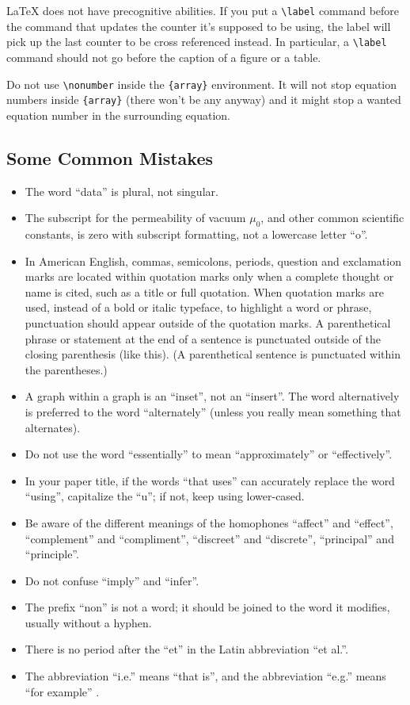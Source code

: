 \documentclass[conference]{IEEEtran}
\begin{document}
{\LaTeX} does not have precognitive abilities. If you put a
\verb|\label| command before the command that updates the counter it's
supposed to be using, the label will pick up the last counter to be
cross referenced instead. In particular, a \verb|\label| command
should not go before the caption of a figure or a table.

Do not use \verb|\nonumber| inside the \verb|{array}| environment. It
will not stop equation numbers inside \verb|{array}| (there won't be
any anyway) and it might stop a wanted equation number in the
surrounding equation.

\subsection{Some Common Mistakes}\label{SCM}
\begin{itemize}
\item The word ``data'' is plural, not singular.
\item The subscript for the permeability of vacuum $\mu_{0}$, and other common scientific constants, is zero with subscript formatting, not a lowercase letter ``o''.
\item In American English, commas, semicolons, periods, question and exclamation marks are located within quotation marks only when a complete thought or name is cited, such as a title or full quotation. When quotation marks are used, instead of a bold or italic typeface, to highlight a word or phrase, punctuation should appear outside of the quotation marks. A parenthetical phrase or statement at the end of a sentence is punctuated outside of the closing parenthesis (like this). (A parenthetical sentence is punctuated within the parentheses.)
\item A graph within a graph is an ``inset'', not an ``insert''. The word alternatively is preferred to the word ``alternately'' (unless you really mean something that alternates).
\item Do not use the word ``essentially'' to mean ``approximately'' or ``effectively''.
\item In your paper title, if the words ``that uses'' can accurately replace the word ``using'', capitalize the ``u''; if not, keep using lower-cased.
\item Be aware of the different meanings of the homophones ``affect'' and ``effect'', ``complement'' and ``compliment'', ``discreet'' and ``discrete'', ``principal'' and ``principle''.
\item Do not confuse ``imply'' and ``infer''.
\item The prefix ``non'' is not a word; it should be joined to the word it modifies, usually without a hyphen.
\item There is no period after the ``et'' in the Latin abbreviation ``et al.''.
\item The abbreviation ``i.e.'' means ``that is'', and the abbreviation ``e.g.'' means ``for example'' \cite{genius}.
\end{itemize}
\end{document}
